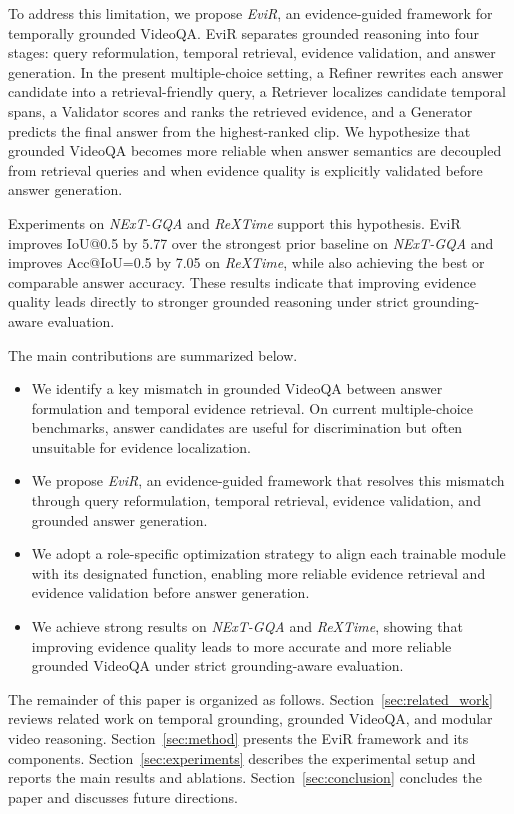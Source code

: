 To address this limitation, we propose \emph{EviR}, an evidence-guided framework for temporally grounded VideoQA. EviR separates grounded reasoning into four stages: query reformulation, temporal retrieval, evidence validation, and answer generation. In the present multiple-choice setting, a Refiner rewrites each answer candidate into a retrieval-friendly query, a Retriever localizes candidate temporal spans, a Validator scores and ranks the retrieved evidence, and a Generator predicts the final answer from the highest-ranked clip. We hypothesize that grounded VideoQA becomes more reliable when answer semantics are decoupled from retrieval queries and when evidence quality is explicitly validated before answer generation.

Experiments on \emph{NExT-GQA} and \emph{ReXTime} support this hypothesis. EviR improves IoU@0.5 by 5.77 over the strongest prior baseline on \emph{NExT-GQA} and improves Acc@IoU=0.5 by 7.05 on \emph{ReXTime}, while also achieving the best or comparable answer accuracy. These results indicate that improving evidence quality leads directly to stronger grounded reasoning under strict grounding-aware evaluation.

The main contributions are summarized below.
\begin{itemize}
    \item We identify a key mismatch in grounded VideoQA between answer formulation and temporal evidence retrieval. On current multiple-choice benchmarks, answer candidates are useful for discrimination but often unsuitable for evidence localization.
    \item We propose \emph{EviR}, an evidence-guided framework that resolves this mismatch through query reformulation, temporal retrieval, evidence validation, and grounded answer generation.
    \item We adopt a role-specific optimization strategy to align each trainable module with its designated function, enabling more reliable evidence retrieval and evidence validation before answer generation.
    \item We achieve strong results on \emph{NExT-GQA} and \emph{ReXTime}, showing that improving evidence quality leads to more accurate and more reliable grounded VideoQA under strict grounding-aware evaluation.
\end{itemize}

The remainder of this paper is organized as follows. Section~\ref{sec:related_work} reviews related work on temporal grounding, grounded VideoQA, and modular video reasoning. Section~\ref{sec:method} presents the EviR framework and its components. Section~\ref{sec:experiments} describes the experimental setup and reports the main results and ablations. Section~\ref{sec:conclusion} concludes the paper and discusses future directions.
